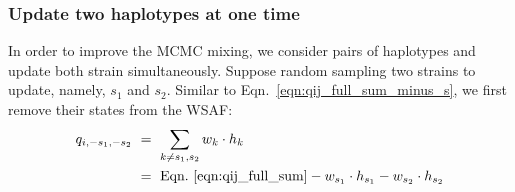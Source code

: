 \documentclass{bioinfo}
\begin{document}







\subsubsection{Update two haplotypes at one time}
In order to improve the MCMC mixing, we consider pairs of haplotypes and update both strain simultaneously. Suppose random sampling two strains to update, namely, $s_1$ and $s_2$. Similar to Eqn.~\eqref{eqn:qij_full_sum_minus_s}, we first remove their states from the WSAF:
\begin{equation}
\begin{split}
q_{i,-s_1, -s_2} & ~ = ~ \sum_{k\neq s_1,s_2} w_k \cdot h_k \\
                 & ~ = ~ \textrm{Eqn.~\eqref{eqn:qij_full_sum}} - w_{s_1} \cdot h_{s_1} - w_{s_2} \cdot h_{s_2} \label{eqn:qij_full_sum_minus_s1_s2}
\end{split}
\end{equation}
\end{document}
